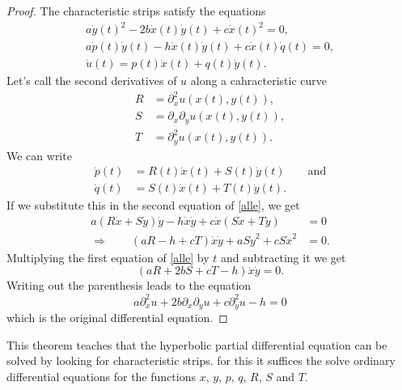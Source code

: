 \begin{proof}
The characteristic strips satisfy the equations
\begin{equation}
\begin{gathered}
a\dot y(t)^2-2b\dot x(t)\dot y(t)+c\dot x(t)^2=0,
\\
a\dot p(t)\dot y(t)-h\dot x(t)\dot y(t)+c\dot x(t)\dot q(t)=0,
\\
\dot u(t)=p(t)\dot x(t)+q(t)\dot y(t).
\end{gathered}
\label{alle}
\end{equation}
Let's call the second derivatives of $u$ along a cahracteristic curve
\begin{align*}
R&=\partial_x^2u(x(t),y(t)),
\\
S&=\partial_x\partial_yu(x(t),y(t)),
\\
T&=\partial_y^2u(x(t),y(t)).
\end{align*}
We can write
\begin{align*}
\dot p(t)&=R(t)\dot x(t)+S(t)\dot y(t)\qquad\text{and}\\
\dot q(t)&=S(t)\dot x(t)+T(t)\dot y(t).
\end{align*}
If we substitute this in the second equation of \eqref{alle}, we get
\begin{align*}
a(R\dot x+S\dot y)\dot y-h\dot x\dot y+c\dot x(S\dot x+T\dot y)&=0
\\
\Rightarrow \qquad(aR-h+cT)\dot x\dot y+aS\dot y^2 +cS \dot x^2&=0.
\end{align*}
Multiplying the first equation of
\eqref{alle} by $t$ and subtracting it we get
\[
(aR+2bS+cT-h)\dot x\dot y=0.
\]
Writing out the parenthesis leads to the equation
\[
a\partial_x^2u+2b\partial_x\partial_yu+c\partial_y^2u-h=0
\]
which is the original differential equation.
\end{proof}
This theorem teaches that the hyperbolic partial differential equation
can be solved by looking for characteristic strips.
for this it suffices the solve ordinary differential equations for the
functions $x$, $y$, $p$, $q$, $R$, $S$ and $T$.


